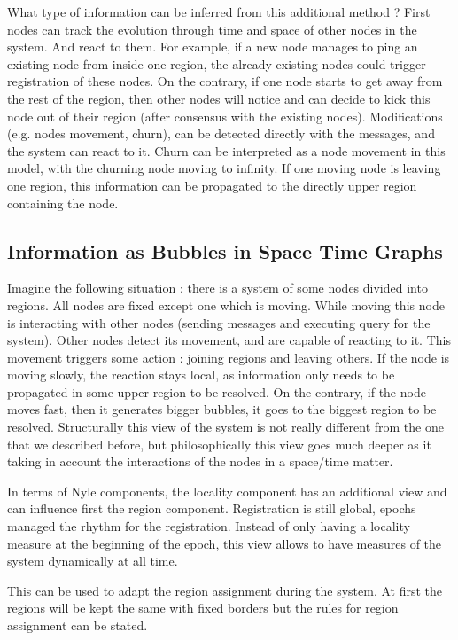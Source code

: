 \documentclass[a4paper,11pt,oneside]{report}
\begin{document}
What type of information can be inferred from this additional method ? First
nodes can track the evolution through time and space of other nodes in the
system. And react to them. For example, if a new node manages to ping an
existing node from inside one region, the already existing nodes could trigger
registration of these nodes. On the contrary, if one node starts to get away
from the rest of the region, then other nodes will notice and can decide to
kick this node out of their region (after consensus with the existing nodes).
Modifications (e.g. nodes movement, churn), can be detected directly with the
messages, and the system can react to it. Churn can be interpreted as a node
movement in this model, with the churning node moving to infinity. If one
moving node is leaving one region, this information can be propagated to the
directly upper region containing the node. 

\subsection{Information as Bubbles in Space Time Graphs}

Imagine the following situation : there is a system of some nodes divided into
regions. All nodes are fixed except one which is moving. While moving this node
is interacting with other nodes (sending messages and executing query for the
system). Other nodes detect its movement, and are capable of reacting to it.
This movement triggers some action : joining regions and leaving others. If the
node is moving slowly, the reaction stays local, as information only needs to
be propagated in some upper region to be resolved. On the contrary, if the node
moves fast, then it generates bigger bubbles, it goes to the biggest region to
be resolved.  Structurally this view of the system is not really different from
the one that we described before, but philosophically this view goes much
deeper as it taking in account the interactions of the nodes in a space/time
matter.

In terms of Nyle components, the locality component has an additional view and
can influence first the region component. Registration is still global, epochs
managed the rhythm for the registration. Instead of only having a locality
measure at the beginning of the epoch, this view allows to have measures of the
system dynamically at all time. 

This can be used to adapt the region assignment during the system. At first the
regions will be kept the same with fixed borders but the rules for region
assignment can be stated. 
\end{document}
